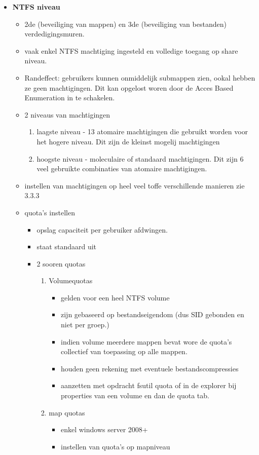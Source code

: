 \begin{itemize}
\item \textbf{NTFS niveau}
\begin{itemize}
\item 2de (beveiliging van mappen) en 3de (beveiliging van bestanden) verdedigingsmuren.
\item vaak enkel NTFS machtiging ingesteld en volledige toegang op share niveau.
\item Randeffect: gebruikers kunnen onmiddelijk submappen zien, ookal hebben ze geen machtigingen. Dit kan opgelost woren door de Acces Based Enumeration in te schakelen.
\item 2 niveaus van machtigingen
\begin{enumerate}
\item laagste niveau - 13 atomaire machtigingen die gebruikt worden voor het hogere niveau. Dit zijn de kleinst mogelij machtigingen
\item hoogste niveau - moleculaire of standaard machtigingen. Dit zijn 6 veel gebruikte combinaties van atomaire machtigingen.
\end{enumerate}
\item instellen van machtigingen op heel veel toffe verschillende manieren zie 3.3.3
\clearpage
\item quota's instellen 
\begin{itemize}
\item opslag capaciteit per gebruiker afdwingen.
\item staat standaard uit
\item 2 sooren quotas
\begin{enumerate}
\item Volumequotas
\begin{itemize}
\item gelden voor een heel NTFS volume
\item zijn gebaseerd op bestandseigendom (dus SID gebonden en niet per groep.)
\item indien volume meerdere mappen bevat wore de quota's collectief van toepassing op alle mappen.
\item houden geen rekening met eventuele bestandscompressies
\item aanzetten met opdracht fsutil quota of in de explorer bij properties van een volume en dan de quota tab.
\end{itemize}
\item map quotas
\begin{itemize}
\item enkel windows server 2008+
\item instellen van quota's op mapniveau

\end{itemize}
\end{enumerate}
\end{itemize}
\end{itemize}
\end{itemize}
